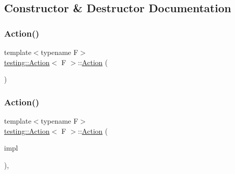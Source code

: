 \subsection{Constructor \& Destructor Documentation}
\mbox{\label{classtesting_1_1_action_a967772922a39dd7098bee429d749f277}} 
\subsubsection{\texorpdfstring{Action()}{Action()}\hspace{0.1cm}{\footnotesize\ttfamily [1/5]}}
{\footnotesize\ttfamily template$<$typename F$>$ \\
\hyperlink{classtesting_1_1_action}{testing\+::\+Action}$<$ F $>$\+::\hyperlink{classtesting_1_1_action}{Action} (\begin{DoxyParamCaption}{ }\end{DoxyParamCaption})\hspace{0.3cm}{\ttfamily [inline]}}

\mbox{\label{classtesting_1_1_action_a5ce44c673e3f91378777b954d88917cd}} 
\subsubsection{\texorpdfstring{Action()}{Action()}\hspace{0.1cm}{\footnotesize\ttfamily [2/5]}}
{\footnotesize\ttfamily template$<$typename F$>$ \\
\hyperlink{classtesting_1_1_action}{testing\+::\+Action}$<$ F $>$\+::\hyperlink{classtesting_1_1_action}{Action} (\begin{DoxyParamCaption}\item[{\hyperlink{classtesting_1_1_action_interface}{Action\+Interface}$<$ F $>$ $\ast$}]{impl }\end{DoxyParamCaption})\hspace{0.3cm}{\ttfamily [inline]}, {\ttfamily [explicit]}}

\mbox{\label{classtesting_1_1_action_a7027316ea3a6972ce7847496eb360ccd}} 

